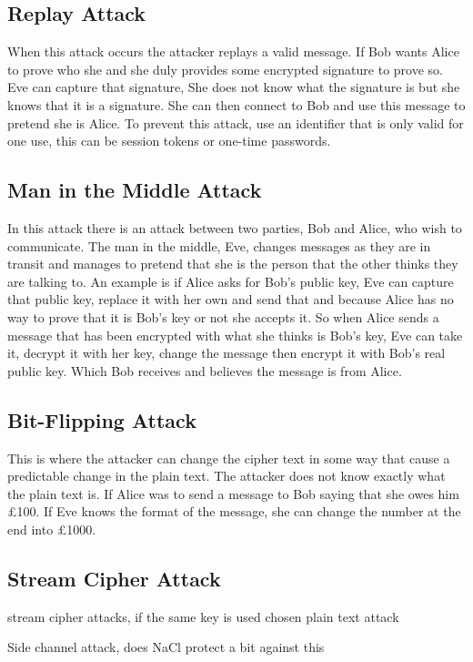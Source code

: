 \subsection{Replay Attack}
When this attack occurs the attacker replays a valid message. If Bob wants Alice to prove who she and she duly provides some encrypted signature to prove so. Eve can capture that signature, She does not know what the signature is but she knows that it is a signature. She can then connect to Bob and use this message to pretend she is Alice. To prevent this attack, use an identifier that is only valid for one use, this can be session tokens or one-time passwords. 

\subsection{Man in the Middle Attack}
In this attack there is an attack between two parties, Bob and Alice, who wish to communicate. The man in the middle, Eve, changes messages as they are in transit and manages to pretend that she is the person that the other thinks they are talking to. An example is if Alice asks for Bob's public key, Eve can capture that public key, replace it with her own and send that and because Alice has no way to prove that it is Bob's key or not she accepts it. So when Alice sends a message that has been encrypted with what she thinks is Bob's key, Eve can take it, decrypt it with her key, change the message then encrypt it with Bob's real public key. Which Bob receives and believes the message is from Alice.

\subsection{Bit-Flipping Attack}
This is where the attacker can change the cipher text in some way that cause a predictable change in the plain text. The attacker does not know exactly what the plain text is. If Alice was to send a message to Bob saying that she owes him £100. If Eve knows the format of the message, she can change the number at the end into £1000. 

\subsection{Stream Cipher Attack}

stream cipher attacks, if the same key is used
chosen plain text attack

Side channel attack, does NaCl protect a bit against this

